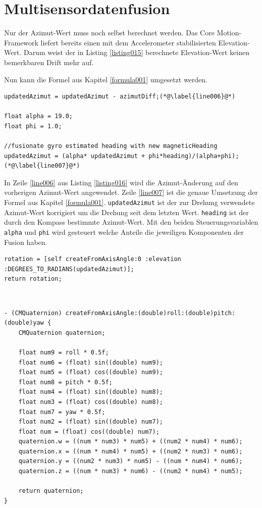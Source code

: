 \section{Multisensordatenfusion}
Nur der Azimut-Wert muss noch selbst berechnet werden. Das Core Motion-Framework liefert bereits einen mit dem Accelerometer stabilisierten Elevation-Wert. Darum weist der in Listing \ref{listing015} berechnete Elevation-Wert keinen bemerkbaren Drift mehr auf.

Nun kann die Formel aus Kapitel \ref{formula001} umgesetzt werden.
~\\
\begin{lstlisting}[float=htb, caption=Eigentliche Datenfusion, label=listing016]
updatedAzimut = updatedAzimut - azimutDiff;(*@\label{line006}@*)

float alpha = 19.0;
float phi = 1.0;

//fusionate gyro estimated heading with new magneticHeading
updatedAzimut = (alpha* updatedAzimut + phi*heading)/(alpha+phi);(*@\label{line007}@*)         
\end{lstlisting}

In Zeile \ref{line006} aus Listing \ref{listing016} wird die Azimut-Änderung auf den vorherigen Azimut-Wert angewendet. Zeile \ref{line007} ist die genaue Umsetzung der Formel aus Kapitel \ref{formula001}. \texttt{updatedAzimut} ist der zur Drehung verwendete Azimut-Wert korrigiert um die Drehung seit dem letzten Wert. \texttt{heading} ist der durch den Kompass bestimmte Azimut-Wert. Mit den beiden Steuerungsvariablen \texttt{alpha} und \texttt{phi} wird gesteuert welche Anteile die jeweiligen Komponenten der Fusion haben.
~\\
\begin{lstlisting}[float=htb, caption=Generierung des Endergebnisses, label=listing017]
rotation = [self createFromAxisAngle:0 :elevation :DEGREES_TO_RADIANS(updatedAzimut)];
return rotation;
\end{lstlisting}
~\\
\begin{lstlisting}[float=htb, caption=Generierung eines Quaternions aus Euler-Winkeln, label=listing018]
- (CMQuaternion) createFromAxisAngle:(double)roll:(double)pitch:(double)yaw {
	CMQuaternion quaternion;
	
	float num9 = roll * 0.5f;
	float num6 = (float) sin((double) num9);
	float num5 = (float) cos((double) num9);
	float num8 = pitch * 0.5f;
	float num4 = (float) sin((double) num8);
	float num3 = (float) cos((double) num8);
	float num7 = yaw * 0.5f;
	float num2 = (float) sin((double) num7);
	float num = (float) cos((double) num7);
	quaternion.w = ((num * num3) * num5) + ((num2 * num4) * num6);
	quaternion.x = ((num * num4) * num5) + ((num2 * num3) * num6);
	quaternion.y = ((num2 * num3) * num5) - ((num * num4) * num6);
	quaternion.z = ((num * num3) * num6) - ((num2 * num4) * num5);
	
	return quaternion;
}
\end{lstlisting}

